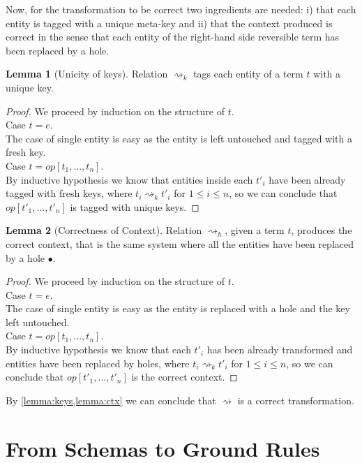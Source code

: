 \documentclass{article}[12pt,a4paper]
\theoremstyle{definition}
\newtheorem{lemma}{Lemma}
\begin{document}
Now, for the transformation to be correct two ingredients are needed: i) that
each entity is tagged with a unique meta-key and ii) that the context produced
is correct in the sense that each entity of the right-hand side reversible term
has been replaced by a hole.

\begin{lemma}[Unicity of keys]\label{lemma:keys}
  Relation $\rightsquigarrow_k$ tags each entity of a term $t$ with a unique key.
\end{lemma}
\begin{proof}
  We proceed by induction on the structure of $t$.\\
  Case $t = e$.\\
  The case of single entity is easy as the entity is left
  untouched and tagged with a fresh key.\\
  Case $t = op[t_1,\ldots,t_n]$.\\
  By inductive hypothesis we know that entities inside each $t'_i$ have been already tagged with
  fresh keys, where $t_i\rightsquigarrow_k t'_i$ for $1 \leq i \leq n$, so we can
  conclude that $op[t'_1,\ldots,t'_n]$ is tagged with unique keys.
\end{proof}

\begin{lemma}[Correctness of Context]\label{lemma:ctx}
  Relation $\rightsquigarrow_h$, given a term $t$, produces the correct context,
  that is the same system where all the entities have been replaced by a hole $\bullet$.
\end{lemma}
\begin{proof}
  We proceed by induction on the structure of $t$.\\
  Case $t = e$.\\
  The case of single entity is easy as the entity is replaced with a hole and
  the key left untouched.\\
  Case $t = op[t_1,\ldots,t_n]$.\\
  By inductive hypothesis we know that each $t'_i$ has been already transformed
  and entities have been replaced by holes, where $t_i\rightsquigarrow_k t'_i$ for $1 \leq i \leq n$, so we can
  conclude that $op[t'_1,\ldots,t'_n]$ is the correct context.
\end{proof}

By \cref{lemma:keys,lemma:ctx} we can conclude that $\rightsquigarrow$ is
a correct transformation. 

\section{From Schemas to Ground Rules}
\end{document}
